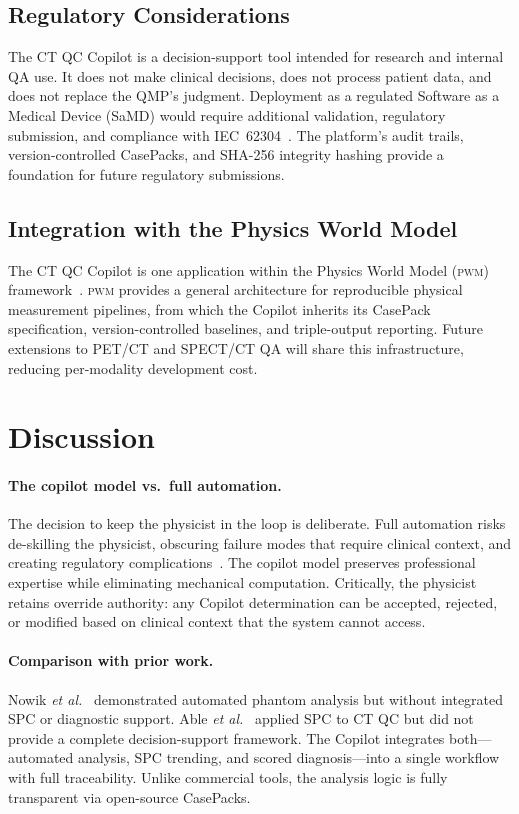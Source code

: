 \documentclass[11pt]{article}
\newcommand{\pwm}{\textsc{pwm}}
\newcommand{\etal}{\textit{et al.}}
\begin{document}
\subsection{Regulatory Considerations}

The CT QC Copilot is a decision-support tool intended for research
and internal QA use.
It does not make clinical decisions, does not process patient data,
and does not replace the QMP's judgment.
Deployment as a regulated Software as a Medical Device (SaMD) would
require additional validation, regulatory submission, and compliance
with IEC~62304~\cite{iec62304,samd_fda}.
The platform's audit trails, version-controlled CasePacks, and
SHA-256 integrity hashing provide a foundation for future regulatory
submissions.

\subsection{Integration with the Physics World Model}

The CT QC Copilot is one application within the Physics World Model
(\pwm{}) framework~\cite{solveeverything}.
\pwm{} provides a general architecture for reproducible physical
measurement pipelines, from which the Copilot inherits its CasePack
specification, version-controlled baselines, and triple-output
reporting.
Future extensions to PET/CT and SPECT/CT QA will share this
infrastructure, reducing per-modality development cost.


\section{Discussion}
\label{sec:discussion}

\paragraph{The copilot model vs.\ full automation.}
The decision to keep the physicist in the loop is deliberate.
Full automation risks de-skilling the physicist, obscuring failure
modes that require clinical context, and creating regulatory
complications~\cite{samd_fda}.
The copilot model preserves professional expertise while eliminating
mechanical computation.
Critically, the physicist retains override authority: any Copilot
determination can be accepted, rejected, or modified based on
clinical context that the system cannot access.

\paragraph{Comparison with prior work.}
Nowik \etal~\cite{nowik2015ct_qa_automation} demonstrated automated
phantom analysis but without integrated SPC or diagnostic support.
Able \etal~\cite{able2016spc_ct} applied SPC to CT QC but did not
provide a complete decision-support framework.
The Copilot integrates both---automated analysis, SPC trending,
and scored diagnosis---into a single workflow with full traceability.
Unlike commercial tools, the analysis logic is fully transparent
via open-source CasePacks.
\end{document}
